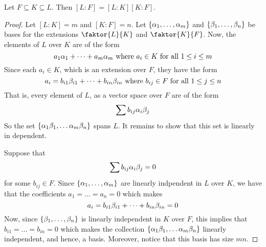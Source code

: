  \begin{theorem}\label{1.2.4}
     Let $F \subseteq K \subseteq L$. Then  $[L:F]=[L:K][K:F]$.
 \end{theorem}
 \begin{proof}
     Let $[L:K]=m$ and $[K:F]=n$. Let $\{\alpha_1, \dots, \alpha_m\}$ and $\{\beta_1,
     \dots, \beta_n\}$ be bases for the extensions $\faktor{L}{K}$ and
     $\faktor{K}{F}$. Now, the elements of $L$ over  $K$ are of the form
     \begin{equation*}
         a_1\alpha_1+\dots+a_m\alpha_m \text{ where } a_i \in K \text{ for all } 1 \leq
         i \leq m
     \end{equation*}
     Since each $a_i \in K$, which is an extension over  $F$, they have the form
     \begin{equation*}
         a_i=b_{i1}\beta_{i1}+\dots+b_{in}\beta_{in} \text{ where } b_{ij} \in F
         \text{ for all } 1 \leq j \leq n
     \end{equation*}
     That is, every element of $L$, as a vector space over $F$ are of the form
     \begin{equation*}
         \sum{b_{ij}\alpha_i\beta_j}
     \end{equation*}
     So the set $\{\alpha_1\beta_1, \dots \alpha_m\beta_n\}$ spans $L$. It remains to show that
     this set is linearly in dependent.

     Suppose that
     \begin{equation*}
         \sum{b_{ij}\alpha_i\beta_j}=0
     \end{equation*}
     for some $b_{ij} \in F$. Since $\{\alpha_1, \dots, \alpha_m\}$ are linearly
     indpendent in $L$ over  $K$, we have that the coefficients
     $a_1=\dots=a_n=0$ which makes
     \begin{equation*}
         a_i=b_{i1}\beta_{i1}+\dots+b_{in}\beta_{in}=0
     \end{equation*}
     Now, since $\{\beta_1, \dots, \beta_n\}$ is linearly independent in $K$ over
     $F$, this implies that $b_{i1}=\dots=b_{in}=0$ which makes the collection
     $\{\alpha_1\beta_1, \dots \alpha_m\beta_n\}$ linearly independent, and hence, a basis.
     Moreover, notice that this basis has size $mn$.
 \end{proof}

